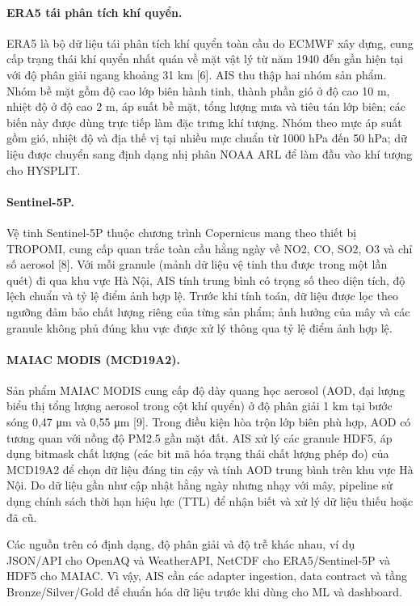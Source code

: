 \documentclass[12pt,a4paper]{article}
\begin{document}
\paragraph{ERA5 tái phân tích khí quyển.}
ERA5 là bộ dữ liệu tái phân tích khí quyển toàn cầu do ECMWF xây dựng, cung cấp trạng thái khí quyển nhất quán về mặt vật lý từ năm 1940 đến gần hiện tại với độ phân giải ngang khoảng 31 km {[}6{]}. AIS thu thập hai nhóm sản phẩm. Nhóm bề mặt gồm độ cao lớp biên hành tinh, thành phần gió ở độ cao 10 m, nhiệt độ ở độ cao 2 m, áp suất bề mặt, tổng lượng mưa và tiêu tán lớp biên; các biến này được dùng trực tiếp làm đặc trưng khí tượng. Nhóm theo mực áp suất gồm gió, nhiệt độ và địa thế vị tại nhiều mực chuẩn từ 1000 hPa đến 50 hPa; dữ liệu được chuyển sang định dạng nhị phân NOAA ARL để làm đầu vào khí tượng cho HYSPLIT.

\paragraph{Sentinel-5P.}
Vệ tinh Sentinel-5P thuộc chương trình Copernicus mang theo thiết bị TROPOMI, cung cấp quan trắc toàn cầu hằng ngày về NO2, CO, SO2, O3 và chỉ số aerosol {[}8{]}. Với mỗi granule (mảnh dữ liệu vệ tinh thu được trong một lần quét) đi qua khu vực Hà Nội, AIS tính trung bình có trọng số theo diện tích, độ lệch chuẩn và tỷ lệ điểm ảnh hợp lệ. Trước khi tính toán, dữ liệu được lọc theo ngưỡng đảm bảo chất lượng riêng của từng sản phẩm; ảnh hưởng của mây và các granule không phủ đúng khu vực được xử lý thông qua tỷ lệ điểm ảnh hợp lệ.

\paragraph{MAIAC MODIS (MCD19A2).}
Sản phẩm MAIAC MODIS cung cấp độ dày quang học aerosol (AOD, đại lượng biểu thị tổng lượng aerosol trong cột khí quyển) ở độ phân giải 1 km tại bước sóng 0,47 \si{\micro\meter} và 0,55 \si{\micro\meter} {[}9{]}. Trong điều kiện hòa trộn lớp biên phù hợp, AOD có tương quan với nồng độ PM2.5 gần mặt đất. AIS xử lý các granule HDF5, áp dụng bitmask chất lượng (các bit mã hóa trạng thái chất lượng phép đo) của MCD19A2 để chọn dữ liệu đáng tin cậy và tính AOD trung bình trên khu vực Hà Nội. Do dữ liệu gần như cập nhật hằng ngày nhưng nhạy với mây, pipeline sử dụng chính sách thời hạn hiệu lực (TTL) để nhận biết và xử lý dữ liệu thiếu hoặc đã cũ.

Các nguồn trên có định dạng, độ phân giải và độ trễ khác nhau, ví dụ JSON/API cho OpenAQ và WeatherAPI, NetCDF cho ERA5/Sentinel-5P và HDF5 cho MAIAC. Vì vậy, AIS cần các adapter ingestion, data contract và tầng Bronze/Silver/Gold để chuẩn hóa dữ liệu trước khi dùng cho ML và dashboard.
\end{document}
